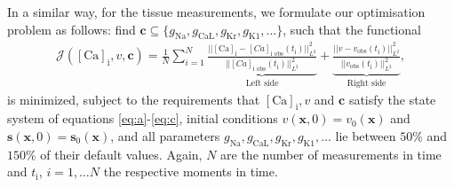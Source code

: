 \documentclass{article}
\begin{document}
In a similar way, for the tissue measurements, we formulate our optimisation problem as follows: find $\boldsymbol{c} \subseteq\{ g_{\mathrm{Na}}, g_{\mathrm{CaL}}, g_{\mathrm{Kr}}, g_{\mathrm{K1}}, \ldots \}$, such that the functional
\begin{eqnarray} 
\mathcal{J}([\mathrm{Ca}]_{\mathrm{i}}, v, \boldsymbol{c}) = \frac{1}{N} \sum_{i=1}^{N} \underbrace{\frac{||[\mathrm{Ca}]_{\mathrm{i}}-[Ca]_{\text{i obs}}(t_{\mathrm{i}}) ||^2_{L^2}}{||[Ca]_{\text{i obs}}(t_{\mathrm{i}}) ||^2_{L^2}}}_{\text{Left side}} +  \underbrace{\frac{||v-v_{\text{obs}}(t_{\mathrm{i}})||^2_{L^2}}{||v_{\text{obs}}(t_{\mathrm{i}})||^2_{L^2}}}_{\text{Right side}},\label{J}
\end{eqnarray}
is minimized, subject to the requirements that $[\mathrm{Ca}]_{\mathrm{i}}, v$ and $\boldsymbol{c}$ satisfy the state system of equations \eqref{eq:a}-\eqref{eq:c}, initial conditions $v(\textbf{x},0)=v_0(\textbf{x})$ and $\mathbf{s}(\mathbf{x},0)=\mathbf{s}_0(\mathbf{x})$, and all parameters $g_{\mathrm{Na}}, g_{\mathrm{CaL}}, g_{\mathrm{Kr}}, g_{\mathrm{K1}}, \ldots$ lie between $50\%$ and $150\%$ of their default values. Again, $N$ are the number of measurements in time and $t_{\mathrm{i}}$, $i=1, \dots N$ the respective moments in time. 
%
\end{document}
